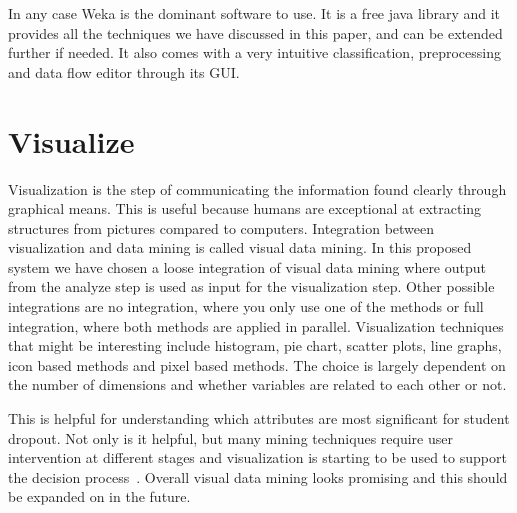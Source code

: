 \bigskip\noindent
In any case Weka is the dominant software to use. 
It is a free java library and it provides all the techniques we have discussed in this paper, and can be extended further if needed.
It also comes with a very intuitive classification, preprocessing and data flow editor through its GUI.

\section{Visualize}	
Visualization is the step of communicating the information found clearly through graphical means. 
This is useful because humans are exceptional at extracting structures from pictures compared to computers. 
Integration between visualization and data mining is called visual data mining.
In this proposed system we have chosen a loose integration of visual data mining where output from the analyze step is used as input for the visualization step.
Other possible integrations are no integration, where you only use one of the methods or full integration, where both methods are applied in parallel.
Visualization techniques that might be interesting include histogram, pie chart, scatter plots, line graphs, icon based methods and pixel based methods.
The choice is largely dependent on the number of dimensions and whether variables are related to each other or not.

\bigskip\noindent
This is helpful for understanding which attributes are most significant for student dropout. 
Not only is it helpful, but many mining techniques require user intervention at different stages and visualization is starting to be used to support the decision process~\cite{1207445}.
Overall visual data mining looks promising and this should be expanded on in the future.
